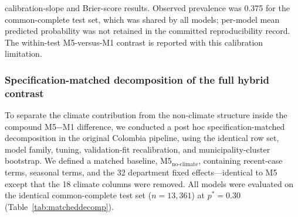 \documentclass[11pt,a4paper]{article}
\begin{document}
calibration-slope and Brier-score results. Observed prevalence was 0.375 for the common-complete test set, which was shared by all models; per-model mean predicted probability was not retained in the committed reproducibility record. The within-test M5-versus-M1 contrast is reported with this calibration limitation.

\subsubsection*{Specification-matched decomposition of the full hybrid contrast}
To separate the climate contribution from the non-climate structure inside the compound M5$-$M1 difference, we conducted a post hoc specification-matched decomposition in the original Colombia pipeline, using the identical row set, model family, tuning, validation-fit recalibration, and municipality-cluster bootstrap. We defined a matched baseline, M5$_{\text{no-climate}}$, containing recent-case terms, seasonal terms, and the 32 department fixed effects---identical to M5 except that the 18 climate columns were removed. All models were evaluated on the identical common-complete test set ($n=13{,}361$) at $p^*=0.30$ (Table~\ref{tab:matcheddecomp}).
\end{document}
